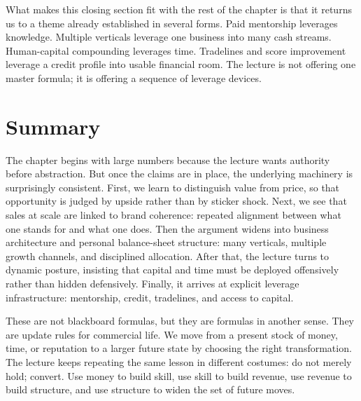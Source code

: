 What makes this closing section fit with the rest of the chapter is that it returns us to a theme already established in several forms. Paid mentorship leverages knowledge. Multiple verticals leverage one business into many cash streams. Human-capital compounding leverages time. Tradelines and score improvement leverage a credit profile into usable financial room. The lecture is not offering one master formula; it is offering a sequence of leverage devices.

\section{Summary}

The chapter begins with large numbers because the lecture wants authority before abstraction. But once the claims are in place, the underlying machinery is surprisingly consistent. First, we learn to distinguish value from price, so that opportunity is judged by upside rather than by sticker shock. Next, we see that sales at scale are linked to brand coherence: repeated alignment between what one stands for and what one does. Then the argument widens into business architecture and personal balance-sheet structure: many verticals, multiple growth channels, and disciplined allocation. After that, the lecture turns to dynamic posture, insisting that capital and time must be deployed offensively rather than hidden defensively. Finally, it arrives at explicit leverage infrastructure: mentorship, credit, tradelines, and access to capital.

These are not blackboard formulas, but they are formulas in another sense. They are update rules for commercial life. We move from a present stock of money, time, or reputation to a larger future state by choosing the right transformation. The lecture keeps repeating the same lesson in different costumes: do not merely hold; convert. Use money to build skill, use skill to build revenue, use revenue to build structure, and use structure to widen the set of future moves.